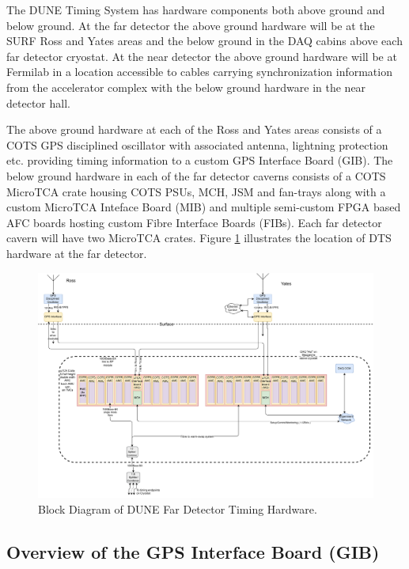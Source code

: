 \documentclass[fleqn,12pt,a4paper]{olplainarticle}
\begin{document}
The DUNE Timing System has hardware components both above ground and below ground. At the far detector the above ground hardware will be at the SURF Ross and Yates areas and the below ground in the DAQ cabins above each far detector cryostat. At the near detector the above ground hardware will be at Fermilab in a location accessible to cables carrying synchronization information from the accelerator complex with the below ground hardware in the near detector hall.

The above ground hardware at each of the Ross and Yates areas consists of a COTS GPS disciplined oscillator with associated antenna, lightning protection etc. providing timing information to a custom GPS Interface Board (GIB). The below ground hardware in each of the far detector caverns consists of a COTS MicroTCA crate housing COTS PSUs, MCH, JSM and fan-trays along with a custom MicroTCA Inteface Board (MIB) and multiple semi-custom FPGA based AFC boards hosting custom Fibre Interface Boards (FIBs). Each far detector cavern will have two MicroTCA crates.
Figure \ref{fig:dts_fd_block_diagram} illustrates the location of DTS hardware at the far detector.

\begin{figure}[ht]
\centering
\includegraphics[width=\linewidth]{dune_timing_system_block_diagram_twepp22_1sept22_02.drawio.pdf}
\caption{Block Diagram of DUNE Far Detector Timing Hardware.}
\label{fig:dts_fd_block_diagram}
\end{figure}

\subsection{Overview of the GPS Interface Board (GIB)}
\end{document}
